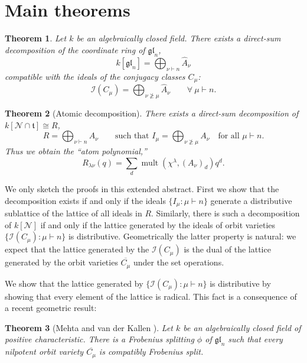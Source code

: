 \documentclass[12pt]{article}
\newcommand{\set}[1]{\{#1\}}
\newcommand{\isom}{\cong}
\newcommand{\la}{{\lambda}}
\newcommand{\ptn}{\vdash}
\newcommand{\bigdsum}{\bigoplus}
\newcommand{\I}{{\mathcal{I}}}
\newcommand{\gln}{{\mathfrak{gl}}_{n}}
\newcommand{\n}{{\mathcal{N}}}
\newcommand{\Cmu}{C_{\mu}}
\newcommand{\closure}[1]{\overline{#1}}
\newcommand{\Cbar}[1]{\closure{C_{#1}}}
\newcommand{\Cmubar}{\Cbar{\mu}}
\newcommand{\Imu}{I_{\mu}}
\renewcommand{\t}{{\mathfrak{t}}}
\newcommand{\mult}{\operatorname{mult}}
\numberwithin{equation}{section}
\theoremstyle{plain}
\newtheorem{theorem}{Theorem}[section]
\theoremstyle{definition}
\theoremstyle{remark}
\begin{document}
\section{Main theorems}
\label{sec:mainthm}
\begin{theorem}\label{thm:MainUpstairs}
Let $k$ be an algebraically closed field.  There exists a direct-sum
decomposition of the coordinate ring of $\gln$,
\begin{equation}
k[\gln] = \bigdsum_{\nu\ptn n} \hat{A}_{\nu}
\end{equation}
compatible with the ideals of the conjugacy classes $\Cmu$:
\begin{equation}
\I(\Cmu)=\bigdsum_{\nu\not\geq\mu}\hat{A}_{\nu}\qquad\forall\ \mu\ptn n.
\end{equation}
\end{theorem}
\begin{theorem}[Atomic decomposition]\label{thm:Main}
There exists a direct-sum decomposition of $k[\n\cap\t]\isom R$,
\begin{equation}
R = \bigdsum_{\nu\ptn n} A_{\nu} \qquad\text{such that }
I_{\mu} = \bigdsum_{\nu\not\geq\mu} A_{\nu} \quad \text{for all }\mu\ptn n.
\end{equation}
Thus we obtain the ``atom polynomial,''
\begin{equation}
R_{\la\nu}(q) = \sum _{d} \mult (\chi ^{\lambda }, (A_{\nu})_{d}) q^{d}.
\end{equation}
\end{theorem}
We only sketch the proofs in this extended abstract.  First we show
that the decomposition exists if and only if the ideals
$\set{\Imu:\mu\ptn n}$ generate a distributive sublattice of the
lattice of all ideals in $R$.  Similarly, there is such a
decomposition of $k[\n]$ if and only if the lattice generated by the
ideals of orbit varieties $\set{\I(\Cmu):\mu\ptn n}$ is distributive.
Geometrically the latter property is natural: we expect that the
lattice generated by the $\I(\Cmu)$ is the dual of the lattice
generated by the orbit varieties $\Cmubar$ under the set operations.

We show that the lattice generated by $\set{\I(\Cmu):\mu\ptn n}$ is 
distributive by showing that every 
element of the lattice is radical.  This fact is a consequence 
of a recent geometric result:
\begin{theorem}[Mehta and van der Kallen \cite{Mehta&vanderKallen}]
\label{MvdKthm}
Let $k$ be an algebraically closed field of positive characteristic.
There is a Frobenius splitting $\phi$ of $\gln$ such that every
nilpotent orbit variety $\Cmubar$ is compatibly Frobenius split.
\end{theorem}
\end{document}
